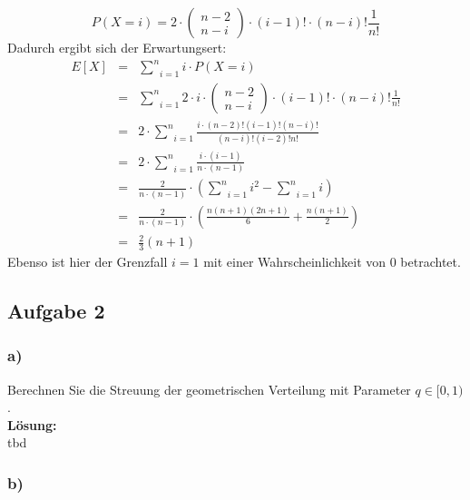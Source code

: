 \documentclass[11pt,a4paper,ngerman]{article}
\begin{document}
\begin{description}
        \[
            P(X=i) = 2 \cdot \begin{pmatrix} n - 2 \\ n-i \end{pmatrix} \cdot (i-1)! \cdot (n-i)! \frac{1}{n!}
        \]
        Dadurch ergibt sich der Erwartungsert:
        \[\begin{array}{rcl}
            E[X] &=& \underset{i=1}{\overset{n}{\sum}} i \cdot P(X=i)\\
                &=& \underset{i=1}{\overset{n}{\sum}} 2 \cdot i \cdot \begin{pmatrix} n - 2 \\ n - i \end{pmatrix} \cdot (i-1)! \cdot (n-i)! \frac{1}{n!}\\
                &=& 2 \cdot \underset{i=1}{\overset{n}{\sum}} \frac{ i \cdot (n-2)! (i-1)! (n-i)!} { (n-i)! (i - 2)!n!}\\
                &=& 2 \cdot \underset{i=1}{\overset{n}{\sum}} \frac{ i \cdot (i-1)} {n \cdot (n-1)}\\
                &=& \frac{2}{n \cdot (n-1)} \cdot \left( \underset{i=1}{\overset{n}{\sum}} i^2 - \underset{i=1}{\overset{n}{\sum}} i\right)\\
                &=& \frac{2}{n \cdot (n-1)} \cdot \left( \frac{n(n+1)(2 n+1)}{6} + \frac{n(n+1)}{2}\right)\\
                &=& \frac{2}{3} (n+1)
        \end{array}\]
        Ebenso ist hier der Grenzfall $i=1$ mit einer Wahrscheinlichkeit von $0$ betrachtet.
\end{description}

\subsection*{Aufgabe 2}

\subsubsection*{a)}

Berechnen Sie die Streuung der geometrischen Verteilung mit Parameter $q \in [0,1)$.\\

\textbf{Lösung:}\\

tbd

\subsubsection*{b)}
\end{document}
